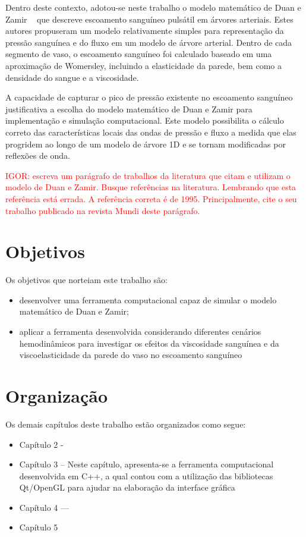 \documentclass[
        english,			
        brazil			        %
        ,<...>]{abntbibufjf}
\begin{document}
Dentro deste contexto, adotou-se neste trabalho o modelo matemático de Duan e Zamir ~\cite{Duan} que descreve escoamento sanguíneo pulsátil em árvores arteriais. Estes autores propuseram um modelo relativamente simples para representação da pressão sanguínea e do fluxo em um modelo de árvore arterial. Dentro de cada segmento de vaso, o escoamento sanguíneo foi calculado baseado em uma aproximação de Womersley, incluindo a elasticidade da parede, bem como a densidade do sangue e a viscosidade.

A capacidade de capturar o pico de pressão existente no escoamento sanguíneo justificativa a escolha do modelo matemático de Duan e Zamir para implementação e simulação computacional. Este modelo possibilita o cálculo correto das características locais das ondas de pressão e fluxo a medida que elas progridem ao longo de um modelo de árvore 1D e se tornam modificadas por reflexões de onda.

\textcolor{red}{IGOR: escreva um parágrafo de trabalhos da literatura que citam e utilizam o modelo de Duan e Zamir. Busque referências na literatura. Lembrando que esta referência \cite{Duan} está errada. A referência correta é de 1995. Principalmente, cite o seu trabalho publicado na revista Mundi deste parágrafo.}

\section{Objetivos}\label{sec:obj}

Os objetivos que norteiam este trabalho são:
\begin{itemize}
    \item desenvolver uma ferramenta computacional capaz de simular o modelo matemático de Duan e Zamir;
    \item aplicar a ferramenta desenvolvida considerando diferentes cenários hemodinâmicos para investigar os efeitos da viscosidade sanguínea e da viscoelasticidade da parede do vaso no escoamento sanguíneo
\end{itemize}

\section{Organização}\label{sec:org}

Os demais capítulos deste trabalho estão organizados como segue:
\begin{itemize}
    \item Capítulo 2 -
    
    \item Capítulo 3 --
    Neste capítulo, apresenta-se a ferramenta computacional desenvolvida em C++,  a qual contou com a utilização das bibliotecas Qt/OpenGL para ajudar na elaboração da interface gráfica
    \item Capítulo 4 ---
    
    \item Capítulo 5
\end{itemize}
\end{document}
